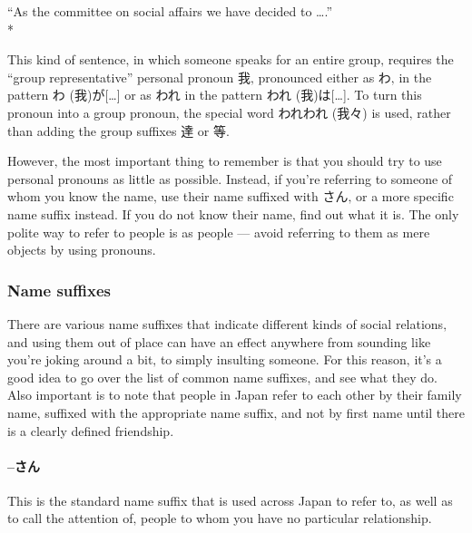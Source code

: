 \documentclass[11pt, b5paper, twoside, openright, onecolumn]{book}
\makeatletter
\newcommand*{\rubystack}[2]{{\relscale{0.5}%
  \begin{tabular}[b]{@{}c@{}}%
    {#1}\\%
   {\textscale{2}{#2}}%
  \end{tabular}}%
}
\DeclareRobustCommand*{\ruby}[2]{%
  \mbox{%
    \setlength{\parskip}{0ex}%
    \BeginAccSupp{method=pdfstringdef,ActualText={#1}}%
      \rubystack{\phantom{#2}}{#1}%
      \llap{%
        \rubystack{#2}{\phantom{#1}}%
      }%
    \EndAccSupp{}%
  }%
}
\renewcommand*{\ruby}[2]{#2 (#1)}%
\newenvironment{exampleblock}{
\setlength{\parindent}{0.6in}
\begin{minipage}[t]{\dimexpr\textwidth-\parindent}}
{\end{minipage}}
\makeatother
\begin{document}
\vspace{0.4cm}
\begin{exampleblock}
“As the committee on social affairs we have decided to ….” \\* 
\end{exampleblock}
\vspace{0.2cm}

This kind of sentence‚ in which someone speaks for an entire group‚ requires the “group representative” personal pronoun 我‚ pronounced either as わ‚ in the pattern \ruby{我}{わ}が[…] or as われ in the pattern \ruby{我}{われ}は[…]. To turn this pronoun into a group pronoun‚ the special word \ruby{我々}{われわれ} is used‚ rather than adding the group suffixes 達 or 等.

However‚ the most important thing to remember is that you should try to use personal pronouns as little as possible. Instead‚ if you’re referring to someone of whom you know the name‚ use their name suffixed with さん‚ or a more specific name suffix instead. If you do not know their name‚  find out what it is. The only polite way to refer to people is as people — avoid referring to them as mere objects by using pronouns.

\subsubsection{Name suffixes}

There are various name suffixes that indicate different kinds of social relations‚ and using them out of place can have an effect anywhere from sounding like you’re joking around a bit‚ to simply insulting someone. For this reason‚ it’s a good idea to go over the list of common name suffixes‚ and see what they do. Also important is to note that people in Japan refer to each other by their family name‚ suffixed with the appropriate name suffix‚ and not by first name until there is a clearly defined friendship.

\paragraph{–さん}

This is the standard name suffix that is used across Japan to refer to‚ as well as to call the attention of‚ people to whom you have no particular relationship.
\end{document}
